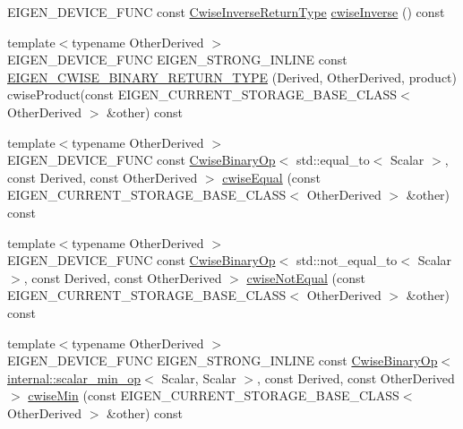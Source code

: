 \begin{DoxyCompactItemize}
\item 
E\+I\+G\+E\+N\+\_\+\+D\+E\+V\+I\+C\+E\+\_\+\+F\+U\+NC const \mbox{\hyperlink{class_eigen_1_1_cwise_unary_op}{Cwise\+Inverse\+Return\+Type}} \mbox{\hyperlink{class_eigen_1_1_sparse_matrix_base_a95fe63ce71f4dac974b9f36fd2e6e8fd}{cwise\+Inverse}} () const
\item 
{\footnotesize template$<$typename Other\+Derived $>$ }\\E\+I\+G\+E\+N\+\_\+\+D\+E\+V\+I\+C\+E\+\_\+\+F\+U\+NC E\+I\+G\+E\+N\+\_\+\+S\+T\+R\+O\+N\+G\+\_\+\+I\+N\+L\+I\+NE const \mbox{\hyperlink{class_eigen_1_1_sparse_matrix_base_af3616697987a1f7f20a5691fe8251e9d}{E\+I\+G\+E\+N\+\_\+\+C\+W\+I\+S\+E\+\_\+\+B\+I\+N\+A\+R\+Y\+\_\+\+R\+E\+T\+U\+R\+N\+\_\+\+T\+Y\+PE}} (Derived, Other\+Derived, product) cwise\+Product(const E\+I\+G\+E\+N\+\_\+\+C\+U\+R\+R\+E\+N\+T\+\_\+\+S\+T\+O\+R\+A\+G\+E\+\_\+\+B\+A\+S\+E\+\_\+\+C\+L\+A\+SS$<$ Other\+Derived $>$ \&other) const
\item 
{\footnotesize template$<$typename Other\+Derived $>$ }\\E\+I\+G\+E\+N\+\_\+\+D\+E\+V\+I\+C\+E\+\_\+\+F\+U\+NC const \mbox{\hyperlink{class_eigen_1_1_cwise_binary_op}{Cwise\+Binary\+Op}}$<$ std\+::equal\+\_\+to$<$ Scalar $>$, const Derived, const Other\+Derived $>$ \mbox{\hyperlink{class_eigen_1_1_sparse_matrix_base_aa55947922b1a537dbcfa857b48625a58}{cwise\+Equal}} (const E\+I\+G\+E\+N\+\_\+\+C\+U\+R\+R\+E\+N\+T\+\_\+\+S\+T\+O\+R\+A\+G\+E\+\_\+\+B\+A\+S\+E\+\_\+\+C\+L\+A\+SS$<$ Other\+Derived $>$ \&other) const
\item 
{\footnotesize template$<$typename Other\+Derived $>$ }\\E\+I\+G\+E\+N\+\_\+\+D\+E\+V\+I\+C\+E\+\_\+\+F\+U\+NC const \mbox{\hyperlink{class_eigen_1_1_cwise_binary_op}{Cwise\+Binary\+Op}}$<$ std\+::not\+\_\+equal\+\_\+to$<$ Scalar $>$, const Derived, const Other\+Derived $>$ \mbox{\hyperlink{class_eigen_1_1_sparse_matrix_base_a343a8ed411a643f1ca3ebd5bc28d0d97}{cwise\+Not\+Equal}} (const E\+I\+G\+E\+N\+\_\+\+C\+U\+R\+R\+E\+N\+T\+\_\+\+S\+T\+O\+R\+A\+G\+E\+\_\+\+B\+A\+S\+E\+\_\+\+C\+L\+A\+SS$<$ Other\+Derived $>$ \&other) const
\item 
{\footnotesize template$<$typename Other\+Derived $>$ }\\E\+I\+G\+E\+N\+\_\+\+D\+E\+V\+I\+C\+E\+\_\+\+F\+U\+NC E\+I\+G\+E\+N\+\_\+\+S\+T\+R\+O\+N\+G\+\_\+\+I\+N\+L\+I\+NE const \mbox{\hyperlink{class_eigen_1_1_cwise_binary_op}{Cwise\+Binary\+Op}}$<$ \mbox{\hyperlink{struct_eigen_1_1internal_1_1scalar__min__op}{internal\+::scalar\+\_\+min\+\_\+op}}$<$ Scalar, Scalar $>$, const Derived, const Other\+Derived $>$ \mbox{\hyperlink{class_eigen_1_1_sparse_matrix_base_a4ca1d836da5da6d94c730f22efac78ef}{cwise\+Min}} (const E\+I\+G\+E\+N\+\_\+\+C\+U\+R\+R\+E\+N\+T\+\_\+\+S\+T\+O\+R\+A\+G\+E\+\_\+\+B\+A\+S\+E\+\_\+\+C\+L\+A\+SS$<$ Other\+Derived $>$ \&other) const

\end{DoxyCompactItemize}
